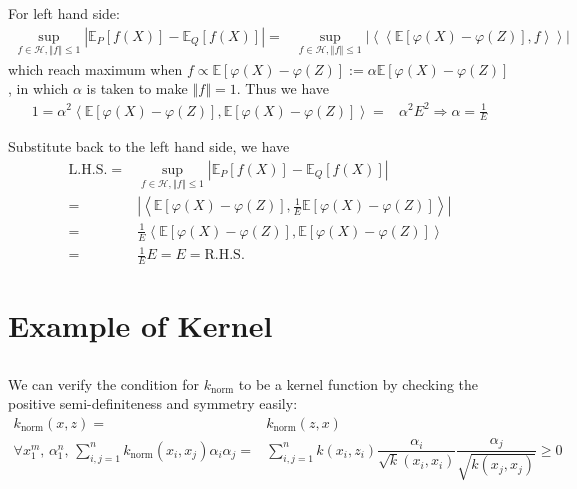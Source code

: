 \documentclass[11pt,a4paper]{ctexart}
\numberwithin{equation}{section}%
\begin{document}
For left hand side:
\begin{align*}
    \mathop{ \sup }\limits_{f\in\mathcal{H},\left\Vert f \right\Vert \leq 1}\left\vert \mathbb{E}_P\left[ f(X) \right] -\mathbb{E}_Q\left[ f(X) \right] \right\vert =& \mathop{ \sup }\limits_{f\in\mathcal{H},\left\Vert f \right\Vert \leq 1}\left\vert \left\langle \left\langle \mathbb{E}\left[ \varphi (X)-\varphi (Z) \right] ,f  \right\rangle  \right\rangle  \right\vert 
\end{align*}
which reach maximum when $ f\propto \mathbb{E}\left[ \varphi (X)-\varphi (Z) \right] := \alpha \mathbb{E}\left[ \varphi (X)-\varphi (Z) \right] $, in which $ \alpha  $ is taken to make $ \left\Vert f \right\Vert =1 $. Thus we have
\begin{align*}
    1=\alpha ^2\left\langle \mathbb{E}\left[ \varphi (X)-\varphi (Z) \right],\mathbb{E}\left[ \varphi (X)-\varphi (Z) \right] \right\rangle =& \alpha ^2E^2  \Rightarrow \alpha =\frac{1}{E} 
\end{align*}

Substitute back to the left hand side, we have
\begin{align*}
     \mathrm{L.H.S.}=&\mathop{ \sup }\limits_{f\in\mathcal{H},\left\Vert f \right\Vert \leq 1}\left\vert \mathbb{E}_P\left[ f(X) \right] -\mathbb{E}_Q\left[ f(X) \right] \right\vert \\
     =& \left\vert \left\langle \mathbb{E}\left[ \varphi (X)-\varphi (Z) \right] ,\frac{1}{E}\mathbb{E}\left[ \varphi (X)-\varphi (Z) \right]  \right\rangle  \right\vert \\
    =& \frac{1}{E}\left\langle \mathbb{E}\left[ \varphi (X)-\varphi (Z) \right] ,\mathbb{E}\left[ \varphi (X)-\varphi (Z) \right]  \right\rangle \\
    =& \frac{1}{E}E=E = \mathrm{R.H.S.}
\end{align*}


\section{Example of Kernel}

\subsection{}
We can verify the condition for $ k_\mathrm{ norm }  $ to be a kernel function by checking the positive semi-definiteness and symmetry easily:
\begin{align*}
    k_\mathrm{ norm }  (x,z) = & k_\mathrm{ norm } (z,x)\\
    \forall x_1^m,\,\alpha _1^n,\, \sum_{i,j=1}^n k_\mathrm{ norm }(x_i,x_j)\alpha _i\alpha _j = & \sum_{i,j=1}^n k(x_i,z_i)\dfrac{ \alpha _i }{ \sqrt{k}(x_i,x_i) }\dfrac{ \alpha _j }{ \sqrt{k(x_j,x_j)} }\geq 0  
\end{align*}
\end{document}
